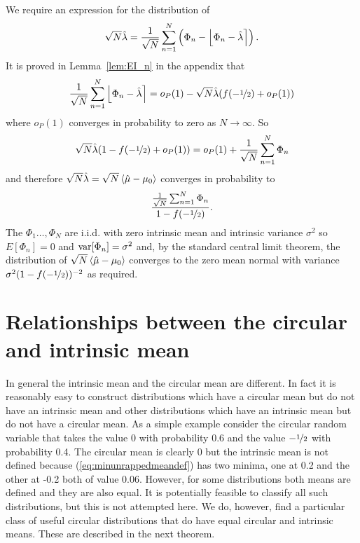 \documentclass[journal]{IEEEtran}
\begin{document}
\begin{IEEEproof}
We require an expression for the distribution of
\[
\sqrt{N}\hat{\lambda} = \frac{1}{\sqrt{N}}\sum_{n=1}^{N} \left( \Phi_n - {\left\lfloor  \Phi_n - \hat{\lambda}  \right\rceil}\right).
\]
It is proved in Lemma~\ref{lem:EI_n} in the appendix that
\[
\frac{1}{\sqrt{N}}\sum_{n=1}^{N} {\left\lfloor  \Phi_n - \hat{\lambda} \right\rceil} = o_P(1)  - \sqrt{N} \hat{\lambda}( f(-\nicefrac{1}{2}) + o_P(1) )
\]
where $o_P(1)$ converges in probability to zero as $N\rightarrow\infty$.  So
\[
\sqrt{N}\hat{\lambda}(1 - f(-\nicefrac{1}{2}) + o_P(1) ) = o_P(1) + \frac{1}{\sqrt{N}}\sum_{n=1}^{N} \Phi_n
\]
and therefore $\sqrt{N}\hat{\lambda} = \sqrt{N}\left< \hat{\mu} - \mu_0 \right>$ converges in probability to
\[
\frac{\frac{1}{\sqrt{N}}\sum_{n=1}^{N} \Phi_n}{1 - f(-\nicefrac{1}{2})}.
\]
The $\Phi_1\dots,\Phi_N$ are i.i.d. with zero intrinsic mean and intrinsic variance $\sigma^2$ so $E[\Phi_n] = 0$ and $\operatorname{var}[\Phi_n] = \sigma^2$ and, by the standard central limit theorem, the distribution of $\sqrt{N}\left< \hat{\mu} - \mu_0 \right>$ converges to the zero mean normal with variance $\sigma^2(1 - f(-\nicefrac{1}{2}))^{-2}$ as required. 
\end{IEEEproof}



\section{Relationships between the circular and intrinsic mean}\label{sec:relationships_circ_intrinsic_mean}

In general the intrinsic mean and the circular mean are different. In fact it is reasonably easy to construct distributions which have a circular mean but do not have an intrinsic mean and other distributions which have an intrinsic mean but do not have a circular mean. As a simple example consider the circular random variable that takes the value 0 with probability 0.6 and the value $-\nicefrac{1}{2}$ with probability 0.4.  The circular mean is clearly 0 but the intrinsic mean is not defined because (\ref{eq:minunrappedmeandef}) has two minima, one at 0.2 and the other at -0.2 both of value 0.06.  However, for some distributions both means are defined and they are also equal. It is potentially feasible to classify all such distributions, but this is not attempted here.  We do, however, find a particular class of useful circular distributions that do have equal circular and intrinsic means. These are described in the next theorem.
\end{document}

